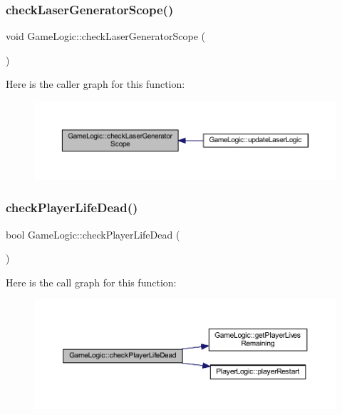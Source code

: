 \subsubsection{\texorpdfstring{check\+Laser\+Generator\+Scope()}{checkLaserGeneratorScope()}}
{\footnotesize\ttfamily void Game\+Logic\+::check\+Laser\+Generator\+Scope (\begin{DoxyParamCaption}{ }\end{DoxyParamCaption})}

Here is the caller graph for this function\+:\nopagebreak
\begin{figure}[H]
\begin{center}
\leavevmode
\includegraphics[width=350pt]{class_game_logic_ada1e9103a2d46866076c2d3b69c7eaff_icgraph}
\end{center}
\end{figure}
\mbox{\label{class_game_logic_a612e0df42ffe7ab590ce5a87c94aa6c9}} 
\subsubsection{\texorpdfstring{check\+Player\+Life\+Dead()}{checkPlayerLifeDead()}}
{\footnotesize\ttfamily bool Game\+Logic\+::check\+Player\+Life\+Dead (\begin{DoxyParamCaption}{ }\end{DoxyParamCaption})}

Here is the call graph for this function\+:\nopagebreak
\begin{figure}[H]
\begin{center}
\leavevmode
\includegraphics[width=350pt]{class_game_logic_a612e0df42ffe7ab590ce5a87c94aa6c9_cgraph}
\end{center}
\end{figure}
\mbox{\label{class_game_logic_a196e25b5a240f8383ce8eab971938fc6}} 
